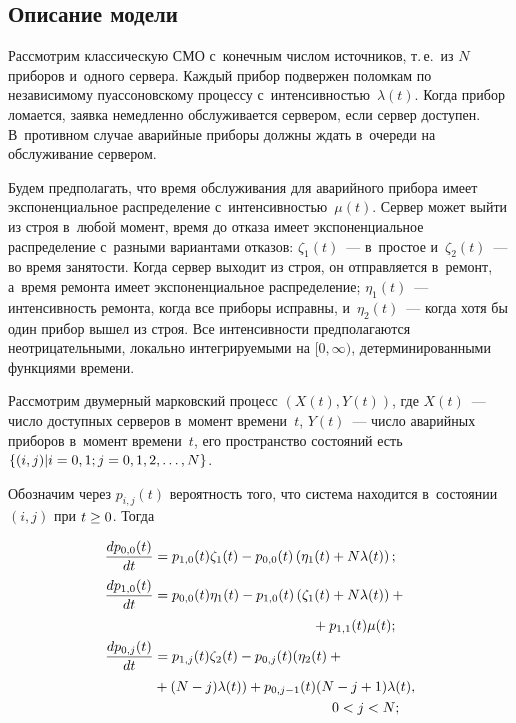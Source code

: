 \begin{multicols}{2}
    \vspace*{-22pt}
    
    \section{Описание модели}
    
    \vspace*{-1pt}
    
    Рассмотрим классическую СМО с~конечным чис\-лом источников, т.\,е.\ из $N$ приборов и~одного сервера. Каж\-дый прибор под\-вер\-жен по\-лом\-кам по 
независимому пуассоновскому процессу с~ин\-тен\-сив\-ностью~$\lambda(t)$. Когда прибор 
ломается, за\-яв\-ка немедленно обслуживается сервером, если сервер до\-сту\-пен. 
В~противном случае
аварийные приборы долж\-ны ждать в~очереди на обслуживание сервером. 

Будем 
предполагать, что время обслуживания для аварийного прибора имеет 
экспоненциальное распределение с~ин\-тен\-сив\-ностью~$\mu(t)$. Сервер
    может выйти из строя в~любой момент, время до отказа имеет 
экспоненциальное распределение с~разными вариантами отказов: $\zeta_1(t)$~--- 
в~простое и~$\zeta_2(t)$~--- во время за\-ня\-тости. Когда сервер выходит из строя, он 
отправляется в~ремонт, а~время ремонта имеет экспоненциальное распределение; 
$\eta_1(t)$~--- ин\-тен\-сив\-ность ремонта, когда все приборы исправны, и~$\eta_2(t)$~--- 
когда хотя бы один прибор вышел из строя. Все интенсивности предполагаются 
не\-от\-ри\-ца\-тель\-ны\-ми, локально ин\-тег\-ри\-ру\-емы\-ми на $[0,\infty)$, детерминированными 
функциями вре\-мени.  

    
    Рассмотрим двумерный марковский процесс $\left(X(t), Y(t)\right)$, где $X(t)$~--- чис\-ло до\-ступ\-ных серверов в~момент времени~$t$, 
$Y(t)$~--- чис\-ло аварийных приборов в~момент времени~$t$, его  пространство 
со\-сто\-яний есть $\{(i, j) \vert  i \hm= 0, 1; j \hm= 0, 1, 2, \ldots, N\}$.  

Обозначим через 
$p_{i, j}(t)$ ве\-ро\-ят\-ность того, что сис\-те\-ма находится в~со\-сто\-янии $(i, j)$ при  $t \hm\geq 0$.
    \mbox{Тогда}
    
    \vspace*{-12pt}
  \begin{align*}
        \fr{dp_{0,0}(t)}{dt} &= p_{1,0}(t)\zeta_1(t)-p_{0,0}(t)\left(\eta_1(t)+N\lambda(t)\right);
   \\
    \fr{dp_{1,0}(t)}{dt}& = p_{0,0}(t)\eta_1(t)-p_{1,0}(t)\left(\zeta_1(t)+N\lambda(t)\right) +{}\\
&\hspace*{40mm}{}+ p_{1,1}(t)\mu(t);\\
\fr{dp_{0,j}(t)}{dt} &= p_{1,j}(t)\zeta_2(t)-p_{0,j}(t)(\eta_2(t)+{}\\
&    {}+(N-j)\lambda(t)) + p_{0,j-1}(t)(N-j+1)\lambda(t),\\
&\hspace*{45mm}0<j<N;
   \end{align*}
    

\end{multicols}
